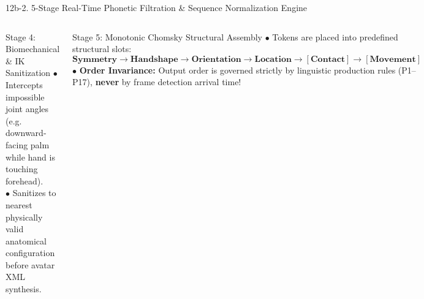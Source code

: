 \documentclass[aspectratio=169]{beamer}
\begin{document}
\begin{frame}[t]{12b-2. 5-Stage Real-Time Phonetic Filtration \& Sequence Normalization Engine}
\begin{columns}[T]
    \begin{block}{Stage 4: Biomechanical \& IK Sanitization}
        \fontsize{6.6pt}{8.4pt}\selectfont
        $\bullet$ Intercepts impossible joint angles (e.g. downward-facing palm while hand is touching forehead).\\
        $\bullet$ Sanitizes to nearest physically valid anatomical configuration before avatar XML synthesis.
    \end{block}

    \begin{block}{Stage 5: Monotonic Chomsky Structural Assembly}
        \fontsize{6.6pt}{8.4pt}\selectfont
        $\bullet$ Tokens are placed into predefined structural slots:
        $$\mathbf{\text{Symmetry} \to \text{Handshape} \to \text{Orientation} \to \text{Location} \to [\text{Contact}] \to [\text{Movement}]}$$
        $\bullet$ \textbf{Order Invariance:} Output order is governed strictly by linguistic production rules (P1--P17), \textbf{never} by frame detection arrival time!
    \end{block}
\end{columns}
\end{frame}
\end{document}
